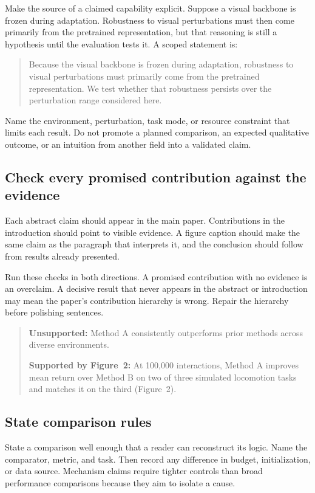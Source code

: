 Make the source of a claimed capability explicit. Suppose a visual backbone
is frozen during adaptation. Robustness to visual perturbations must then come
primarily from the pretrained representation, but that reasoning is still a
hypothesis until the evaluation tests it. A scoped statement is:

\begin{quote}
Because the visual backbone is frozen during adaptation, robustness to visual
perturbations must primarily come from the pretrained representation. We test
whether that robustness persists over the perturbation range considered here.
\end{quote}

Name the environment, perturbation, task mode, or resource constraint that
limits each result. Do not promote a planned comparison, an expected
qualitative outcome, or an intuition from another field into a validated
claim.

\subsection{Check every promised contribution against the evidence}

Each abstract claim should appear in the main paper. Contributions in the
introduction should point to visible evidence. A figure caption should make
the same claim as the paragraph that interprets it, and the conclusion should
follow from results already presented.

Run these checks in both directions. A promised contribution with no evidence
is an overclaim. A decisive result that never appears in the abstract or
introduction may mean the paper's contribution hierarchy is wrong. Repair the
hierarchy before polishing sentences.

\begin{quote}
\textbf{Unsupported:} Method A consistently outperforms prior methods
across diverse environments.

\textbf{Supported by Figure~2:} At 100{,}000 interactions, Method A
improves mean return over Method B on two of three simulated locomotion tasks
and matches it on the third (Figure~2).
\end{quote}

\subsection{State comparison rules}

State a comparison well enough that a reader can reconstruct its logic. Name
the comparator, metric, and task. Then record any difference in budget,
initialization, or data source. Mechanism claims require tighter controls than
broad performance comparisons because they aim to isolate a cause.

